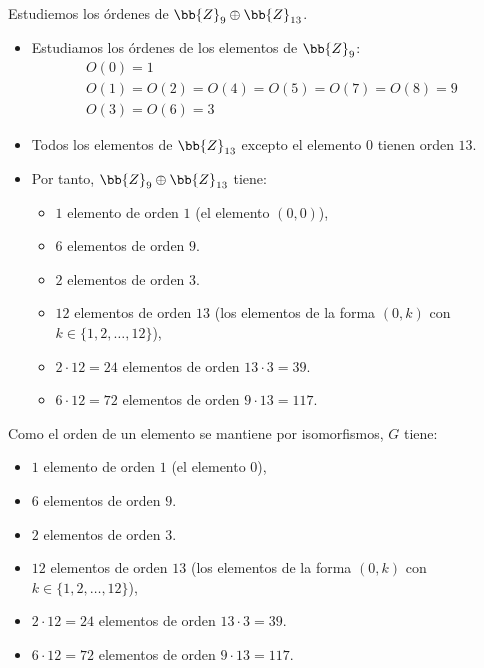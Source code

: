 \begin{ejercicio}
\begin{enumerate}
        Estudiemos los órdenes de $\bb{Z}_9 \oplus \bb{Z}_{13}$.
        \begin{itemize}
            \item Estudiamos los órdenes de los elementos de $\bb{Z}_9$:
            \begin{gather*}
                O(0)=1\\
                O(1)=O(2)=O(4)=O(5)=O(7)=O(8)=9\\
                O(3)=O(6)=3
            \end{gather*}
            \item Todos los elementos de $\bb{Z}_{13}$ excepto el elemento $0$ tienen orden $13$.
            \item Por tanto, $\bb{Z}_9 \oplus \bb{Z}_{13}$ tiene:
            \begin{itemize}
                \item $1$ elemento de orden $1$ (el elemento $(0, 0)$),
                \item $6$ elementos de orden $9$.
                \item $2$ elementos de orden $3$.
                \item $12$ elementos de orden $13$ (los elementos de la forma $(0, k)$ con $k\in \{1, 2, \ldots, 12\}$),
                \item $2\cdot 12=24$ elementos de orden $13\cdot 3=39$.
                \item $6\cdot 12=72$ elementos de orden $9\cdot 13=117$.
            \end{itemize}
        \end{itemize}

        Como el orden de un elemento se mantiene por isomorfismos, $G$ tiene:
        \begin{itemize}
            \item $1$ elemento de orden $1$ (el elemento $0$),
            \item $6$ elementos de orden $9$.
            \item $2$ elementos de orden $3$.
            \item $12$ elementos de orden $13$ (los elementos de la forma $(0, k)$ con $k\in \{1, 2, \ldots, 12\}$),
            \item $2\cdot 12=24$ elementos de orden $13\cdot 3=39$.
            \item $6\cdot 12=72$ elementos de orden $9\cdot 13=117$.
        \end{itemize}
                
    \end{enumerate}
\end{ejercicio}

